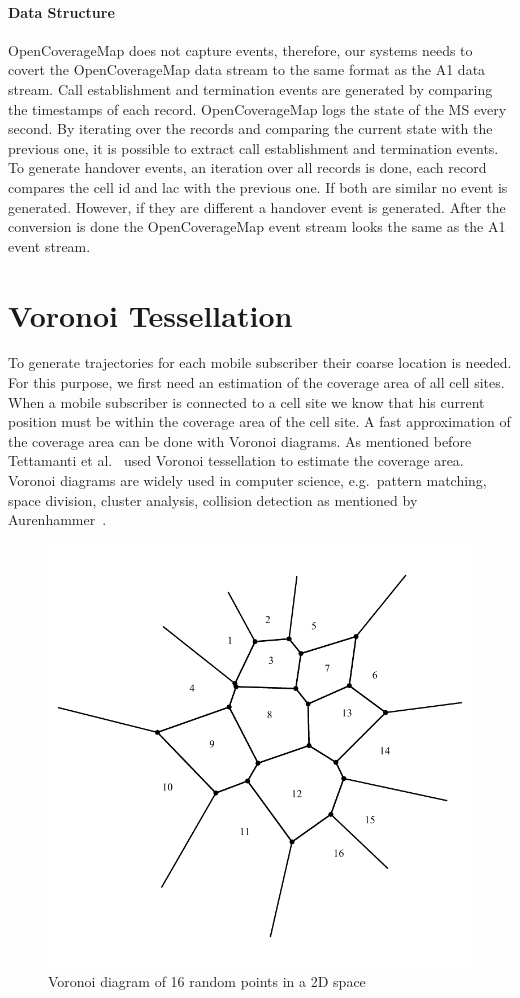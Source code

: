 \documentclass[master,english]{hgbthesis}
\begin{document}
\paragraph{Data Structure}
OpenCoverageMap does not capture events, therefore, our systems needs to covert the OpenCoverageMap data stream to the same format as the A1 data stream. Call establishment and termination events are generated by comparing the timestamps of each record. OpenCoverageMap logs the state of the MS every second. By iterating over the records and comparing the current state with the previous one, it is possible to extract call establishment and termination events. To generate handover events, an iteration over all records is done, each record compares the cell id and lac with the previous one. If both are similar no event is generated. However, if they are different a handover event is generated. After the conversion is done the OpenCoverageMap event stream looks the same as the A1 event stream.
\section{Voronoi Tessellation}
\label{sec:voronoites}
To generate trajectories for each mobile subscriber their coarse location is needed.
For this purpose, we first need an estimation of the coverage area of all cell sites. When a mobile subscriber is connected to a cell site we know that his current position must be within the coverage area of the cell site. A fast approximation of the coverage area can be done with Voronoi diagrams.
As mentioned before Tettamanti et al.~\cite{Tettamanti2012} used Voronoi tessellation to estimate the coverage area.
Voronoi diagrams are widely used in computer science, e.g.\ pattern matching, space division, cluster analysis, collision detection as mentioned by Aurenhammer~\cite{Aurenhammer1991}.
\begin{figure}
	\centering
	\includegraphics[width=0.7\linewidth]{./images/voronoi2}
	\caption{Voronoi diagram of 16 random points in a 2D space}
	\label{fig:voronoi2}
\end{figure}
\end{document}
